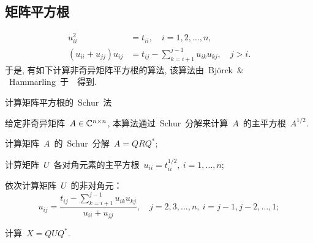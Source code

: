 \subsection{矩阵平方根}

\begin{theorem}

\end{theorem}

\begin{theorem}

\end{theorem}



\begin{theorem}
\end{theorem}


\begin{align*}
u_{ii}^2 & = t_{ii},\quad i = 1,2,\ldots,n,\\
(u_{ii}+u_{jj})u_{ij} & = t_{ij} - \sum_{k=i+1}^{j-1}u_{ik}u_{kj},
\quad j > i.
\end{align*}
于是, 有如下计算非奇异矩阵平方根的算法,
该算法由~Bj\"{o}rck~$\&$~Hammarling~于~\cite{Bjorck1983}~得到.

\begin{algorithm}[h!]
\caption{计算矩阵平方根的~Schur~法~\cite{Bjorck1983}}
\label{al:MatSquRoot_SchurMethod} 给定非奇异矩阵~$A\in\mathbb{C}^{n\times
n}$, 本算法通过~Schur~分解来计算~$A$~的主平方根~$A^{1/2}$.
\begin{list}{.}{
\setlength{\rightmargin}{0em}\setlength{\leftmargin}{1.2em}}
\item
计算矩阵~$A$~的~Schur~分解~$A = QRQ^*$;
\item
计算矩阵~$U$~各对角元素的主平方根~$u_{ii} = t_{ii}^{1/2},\ i = 1,
\ldots, n$;
\item
依次计算矩阵~$U$~的非对角元：
$$
u_{ij} = \displaystyle
\frac{t_{ij}-\displaystyle\sum_{k=i+1}^{j-1}u_{ik}u_{kj}}{u_{ii}+u_{jj}},
\quad j = 2,3,\ldots,n,\ i = j-1,j-2,\ldots,1;
$$
\item
计算~$X = QUQ^*$.
\end{list}
\end{algorithm}

